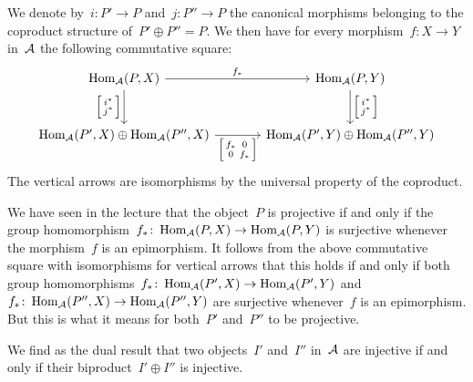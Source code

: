 \section{}

We denote by~$i \colon P' \to P$ and~$j \colon P'' \to P$ the canonical morphisms belonging to the coproduct structure of~$P' \oplus P'' = P$.
We then have for every morphism~$f \colon X \to Y$ in~$\mathcal{A}$ the following commutative square:
\[
  \begin{tikzcd}[ampersand replacement = \&, sep = large]
        \Hom_{\Acat}(P, X)
        \arrow{r}[above]{f_*}
        \arrow{d}[left]{\begin{bsmallmatrix} i^* \\ j^* \end{bsmallmatrix}}
    \&  \Hom_{\Acat}(P, Y)
        \arrow{d}[right]{\begin{bsmallmatrix} i^* \\ j^* \end{bsmallmatrix}}
    \\
        \Hom_{\Acat}(P', X) \oplus \Hom_{\Acat}(P'', X)
        \arrow{r}[below]{\begin{bsmallmatrix} f_* & 0 \\ 0 & f_* \end{bsmallmatrix}}
    \&  \Hom_{\Acat}(P', Y) \oplus \Hom_{\Acat}(P'', Y)
  \end{tikzcd}
\]
The vertical arrows are isomorphisms by the universal property of the coproduct.

We have seen in the lecture that the object~$P$ is projective if and only if the group homomorphism~$f_* \colon \operatorname{Hom}_{\mathcal{A}}(P,X) \to \operatorname{Hom}_{\mathcal{A}}(P,Y)$ is surjective whenever the morphism~$f$ is an epimorphism.
It follows from the above commutative square with isomorphisms for vertical arrows that this holds if and only if both group homomorphisms~$f_* \colon \operatorname{Hom}_{\mathcal{A}}(P',X) \to \operatorname{Hom}_{\mathcal{A}}(P',Y)$ and~$f_* \colon \operatorname{Hom}_{\mathcal{A}}(P'',X) \to \operatorname{Hom}_{\mathcal{A}}(P'',Y)$ are surjective whenever~$f$ is an epimorphism.
But this is what it means for both~$P'$ and~$P''$ to be projective.

We find as the dual result that two objects~$I'$ and~$I''$ in~$\mathcal{A}$ are injective if and only if their biproduct~$I' \oplus I''$ is injective.

